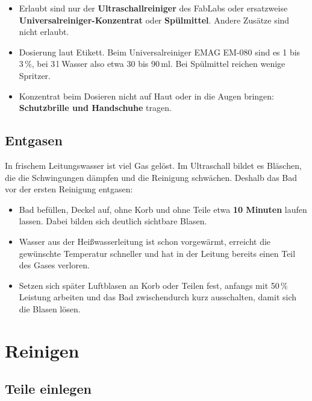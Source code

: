 \documentclass{\basedir/fablab-document}
\begin{document}
	\begin{itemize}
		\item Erlaubt sind nur der \textbf{Ultraschallreiniger} des FabLabs oder ersatzweise \textbf{Universalreiniger-Konzentrat} oder \textbf{Spülmittel}. Andere Zusätze sind nicht erlaubt.
		\item Dosierung laut Etikett. Beim Universalreiniger EMAG EM-080 sind es 1 bis 3\,\%, bei 3\,l Wasser also etwa 30 bis 90\,ml. Bei Spülmittel reichen wenige Spritzer.
		\item Konzentrat beim Dosieren nicht auf Haut oder in die Augen bringen: \textbf{Schutzbrille und Handschuhe} tragen.
	\end{itemize}

	\subsection{Entgasen}
	\label{sec:entgasen}

	In frischem Leitungswasser ist viel Gas gelöst. Im Ultraschall bildet es Bläschen, die die Schwingungen dämpfen und die Reinigung schwächen. Deshalb das Bad vor der ersten Reinigung entgasen:

	\begin{itemize}
		\item Bad befüllen, Deckel auf, ohne Korb und ohne Teile etwa \textbf{10 Minuten} laufen lassen. Dabei bilden sich deutlich sichtbare Blasen.
		\item Wasser aus der Heißwasserleitung ist schon vorgewärmt, erreicht die gewünschte Temperatur schneller und hat in der Leitung bereits einen Teil des Gases verloren.
		\item Setzen sich später Luftblasen an Korb oder Teilen fest, anfangs mit 50\,\% Leistung arbeiten und das Bad zwischendurch kurz ausschalten, damit sich die Blasen lösen.
	\end{itemize}

	\section{Reinigen}

	\subsection{Teile einlegen}
\end{document}
